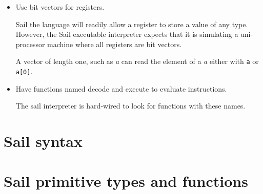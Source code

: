 \documentclass[11pt]{article}
\begin{document}
\begin{itemize}
\item Use bit vectors for registers.

Sail the language will readily allow a register to store a value of
any type. However, the Sail executable interpreter expects that it is
simulating a uni-processor machine where all registers are bit
vectors.

A vector of length one, such as \emph{a} can read the element of a \emph{a}
either with {\tt a} or {\tt a[0]}.

\item Have functions named decode and execute to evaluate
  instructions.

The sail interpreter is hard-wired to look for functions with these names.

\end{itemize}



\section{Sail syntax}

\ottgrammartabular{
\ottl\ottinterrule
\ottannot\ottinterrule
\ottid\ottinterrule
\ottkid\ottinterrule
\ottbaseXXkind\ottinterrule
\ottkind\ottinterrule
\ottnexp\ottinterrule
\ottorder\ottinterrule
\ottbaseXXeffect\ottinterrule
\otteffect\ottinterrule
\otttyp\ottinterrule
\otttypXXarg\ottinterrule
\ottnXXconstraint\ottinterrule
\ottkindedXXid\ottinterrule
\ottquantXXitem\ottinterrule
\otttypquant\ottinterrule
\otttypschm\ottinterrule
\ottnameXXscmXXopt\ottinterrule
\otttypeXXdef\ottinterrule
\otttypeXXunion\ottinterrule
\ottindexXXrange\ottinterrule
\ottlit\ottinterrule
\ottsemiXXopt\ottinterrule
\ottpat\ottinterrule
\ottfpat\ottinterrule
\ottexp\ottinterrule
\ottlexp\ottinterrule
\ottfexp\ottinterrule
\ottfexps\ottinterrule
\ottoptXXdefault\ottinterrule
\ottpexp\ottinterrule
\otttannotXXopt\ottinterrule
\ottrecXXopt\ottinterrule
\otteffectXXopt\ottinterrule
\ottfuncl\ottinterrule
\ottfundef\ottinterrule
\ottletbind\ottinterrule
\ottvalXXspec\ottinterrule
\ottdefaultXXspec\ottinterrule
\ottscatteredXXdef\ottinterrule
\ottregXXid\ottinterrule
\ottaliasXXspec\ottinterrule
\ottdecXXspec\ottinterrule
\ottdef\ottinterrule
\ottdefs\ottinterrule}

\newpage
\section{Sail primitive types and functions}
\end{document}
